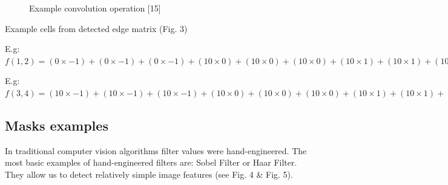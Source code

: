 \documentclass[letterpaper, 10 pt, conference]{ieeeconf}  %
\begin{document}
   \begin{figure}[!ht]
      \centering
      \caption{Example convolution operation [15]}
      \label{figurelabel}
   \end{figure}
\vspace{5mm} %

Example cells from detected edge matrix (Fig. 3)

E.g: $f(1,2) = (0 \times -1) + (0 \times -1) + (0 \times -1) + (10 \times 0) + (10 \times 0) + (10 \times 0) + (10 \times 1) + (10 \times 1) + (10 \times 1) = 0 + 0 + 0 + 0 +0 + 0 + 10 + 10 + 10 = 30$
\vspace{5mm} %

E.g: $f(3,4) = (10 \times -1) + (10 \times -1) + (10 \times -1) + (10 \times 0) + (10 \times 0) + (10 \times 0) + (10 \times 1) + (10 \times 1) + (10 \times 1) = -10 -10 -10 + 0 +0 + 0 + 10 + 10 + 10 = 0$

\subsection{Masks examples}

In traditional computer vision algorithms filter values were hand-engineered. The most basic examples of  hand-engineered filters are: Sobel Filter or Haar Filter. They allow us to detect relatively simple image features (see Fig. 4 \& Fig. 5). 
\end{document}
